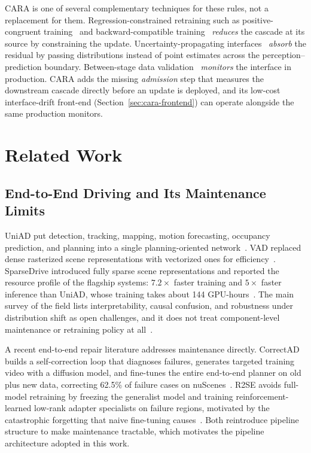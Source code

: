 \documentclass[conference]{IEEEtran}
\begin{document}
CARA is one of several complementary techniques for these rules, not a
replacement for them. Regression-constrained retraining such as
positive-congruent training~\cite{yan2021pctraining} and backward-compatible
training~\cite{shen2020bct} \emph{reduces} the cascade at its source by
constraining the update. Uncertainty-propagating
interfaces~\cite{ivanovic2022propagating} \emph{absorb} the residual by passing
distributions instead of point estimates across the perception--prediction
boundary. Between-stage data validation~\cite{breck2019data} \emph{monitors} the
interface in production. CARA adds the missing \emph{admission} step that measures
the downstream cascade directly before an update is deployed, and its low-cost
interface-drift front-end (Section~\ref{sec:cara-frontend}) can operate alongside
the same production monitors.

\section{Related Work}
\label{sec:related}

\subsection{End-to-End Driving and Its Maintenance Limits}
UniAD put detection, tracking, mapping, motion forecasting, occupancy
prediction, and planning into a single planning-oriented
network~\cite{hu2023uniad}. VAD replaced dense rasterized scene
representations with vectorized ones for efficiency~\cite{jiang2023vad}.
SparseDrive introduced fully sparse scene representations and reported the
resource profile of the flagship systems: $7.2\times$ faster training and
$5\times$ faster inference than UniAD, whose training takes about 144
GPU-hours~\cite{sun2024sparsedrive}. The main survey of the field lists
interpretability, causal confusion, and robustness under distribution shift
as open challenges, and it does not treat component-level maintenance or
retraining policy at all~\cite{chen2024e2esurvey}.

A recent end-to-end repair literature addresses maintenance directly. CorrectAD
builds a self-correction loop that diagnoses failures, generates targeted
training video with a diffusion model, and fine-tunes the entire end-to-end planner
on old plus new data, correcting 62.5\% of failure cases on
nuScenes~\cite{ma2025correctad}. R2SE avoids full-model retraining by freezing
the generalist model and training reinforcement-learned low-rank adapter
specialists on failure regions, motivated by the catastrophic forgetting that
naive fine-tuning causes~\cite{liu2025r2se}. Both reintroduce pipeline structure
to make maintenance tractable, which motivates the pipeline architecture adopted
in this work.
\end{document}
